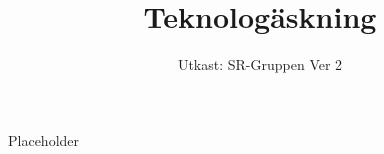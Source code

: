 \documentclass[a4paper]{dtek}
\title{Teknologäskning}
\date{Utkast: SR-Gruppen Ver 2}
\begin{document}
Placeholder
\end{document}
